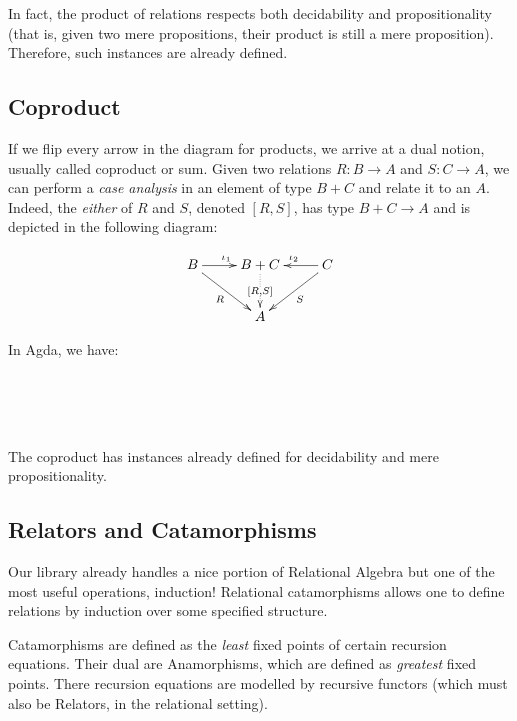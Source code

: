 In fact, the product of relations respects both decidability and propositionality (that is,
given two mere propositions, their product is still a mere proposition). Therefore, such 
instances are already defined.

\subsection{Coproduct}

If we flip every arrow in the diagram for products, we arrive at a dual notion, usually
called coproduct or sum. Given two relations $R : B \rightarrow A$ and $S : C \rightarrow A$,
we can perform a \emph{case analysis} in an element of type $B + C$ and relate it to an $A$.
Indeed, the \emph{either} of $R$ and $S$, denoted $[R , S]$, has type $B + C \rightarrow A$
and is depicted in the following diagram:

\begin{displaymath}
\xymatrix{%
 B \ar[r]^{\iota_1} \ar[dr]_{R} & B + C \ar@{..>}[d]|{[R , S]} & C \ar[l]_{\iota_2} \ar[dl]^{S} \\
   &   A   &
}
\end{displaymath}

In Agda, we have:

\\
\\
\\

The coproduct has instances already defined for decidability and mere propositionality.

\subsection{Relators and Catamorphisms}

Our library already handles a nice portion of Relational Algebra but one of the most
useful operations, induction! Relational catamorphisms allows one to define relations
by induction over some specified structure. 

Catamorphisms are defined as the \emph{least} fixed points of certain recursion equations. Their
dual are Anamorphisms, which are defined as \emph{greatest} fixed points. There recursion equations
are modelled by recursive functors (which must also be Relators, in the relational setting).\\

